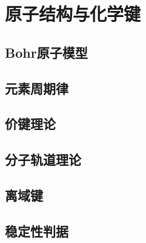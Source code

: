 \section{原子结构与化学键}
\subsection{Bohr原子模型}
\subsection{元素周期律}
\subsection{价键理论}
\subsection{分子轨道理论}
\subsection{离域键}
\subsection{稳定性判据}

\newpage
